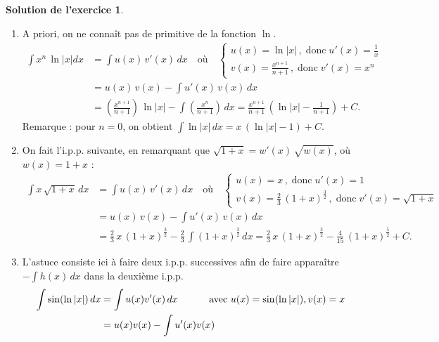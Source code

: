 \documentclass[a4paper, 11pt,openany]{article}%
\theoremstyle{plain}
\theoremstyle{definition}
\newtheorem{exo}{Exercice}
\newtheorem{sol}{Solution de l'exercice}
\theoremstyle{remark}
\begin{document}


\begin{sol}
\begin{enumerate}
\item  A priori, on ne connaît pas
de primitive de la fonction $\ln$.
\begin{align*}\int x^n\,\ln|x| dx &= \int u(x)\, v'(x)\, dx \quad \text{où}\quad \begin{cases}
 u(x)=\ln|x|\,,\;\text{donc}\; u'(x)=\frac{1}{x}\\
 v(x)=\frac{x^{n+1}}{n+1}\,,\;\text{donc}\;v'(x)=x^n\end{cases}\\
&=u(x)\,v(x)-\int u'(x)\, v(x)\, dx\\
&= \left(\frac{x^{n+1}}{n+1}\right)\,\ln|x|-\int\left(\frac{x^{n}}{n+1}\right)\,dx
=\frac{x^{n+1}}{n+1}\,\left(\ln|x|-\frac{1}{n+1}\right)+C.
\end{align*}
Remarque : pour $n=0$, on obtient $\displaystyle{\int \ln|x|\,dx=x\,(\ln|x|-1)+C}$.
\item On fait l'i.p.p. suivante, en remarquant que $\sqrt{1+x}=w'(x)\,\sqrt{w(x)}$, où $w(x)=1+x$ :
\begin{align*}
\int x\,\sqrt{1+x}\, dx &= \int u(x)\, v'(x)\, dx \quad \text{où}\quad \begin{cases}
 u(x)=x\,,\;\text{donc}\; u'(x)=1\\
 v(x)=\frac{2}{3}\,(1+x)^{\frac{3}{2}}\,,\;\text{donc}\;v'(x)=\sqrt{1+x}\end{cases}\\
&=u(x)\,v(x)-\int u'(x)\, v(x)\, dx\\
&= \frac{2}{3}\,x\, (1+x)^{\frac{3}{2}}-\frac{2}{3}\,\int(1+x)^{\frac{3}{2}}\,dx
=\frac{2}{3}\,x\, (1+x)^{\frac{3}{2}}-\frac{4}{15}\, (1+x)^{\frac{5}{2}}+C.
\end{align*}
\item L'astuce consiste ici à faire deux i.p.p. successives afin de faire apparaître $-\int h(x)\,dx$ dans la
deuxième i.p.p.
\begin{align*}
  \int \sin(\ln|x|)\, dx &= \int u(x) v'(x)\, dx\mbox{\hspace{1cm} avec } u(x)=\sin(\ln|x|), v(x)=x\\
&= u(x) v(x) - \int  u'(x) v(x)\\

\end{align*}
\end{enumerate}
\end{sol}
\end{document}
